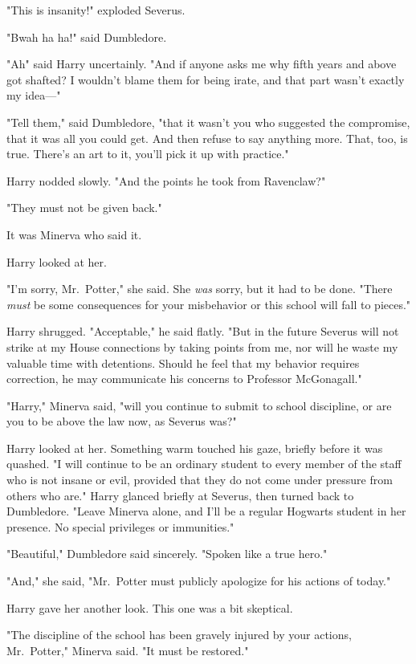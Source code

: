 "This is insanity!" exploded Severus.

"Bwah ha ha!" said Dumbledore.

"Ah{\el}" said Harry uncertainly. "And if anyone asks me why fifth years and
above got shafted? I wouldn't blame them for being irate, and that part wasn't
exactly my idea\mbox{---}"

"Tell them," said Dumbledore, "that it wasn't you who suggested the compromise,
that it was all you could get. And then refuse to say anything more. That, too,
is true. There's an art to it, you'll pick it up with practice."

Harry nodded slowly. "And the points he took from Ravenclaw?"

"They must not be given back."

It was Minerva who said it.

Harry looked at her.

"I'm sorry, Mr.~Potter," she said. She \emph{was} sorry, but it had to be done.
"There \emph{must} be some consequences for your misbehavior or this school
will fall to pieces."

Harry shrugged. "Acceptable," he said flatly. "But in the future Severus will
not strike at my House connections by taking points from me, nor will he waste
my valuable time with detentions. Should he feel that my behavior requires
correction, he may communicate his concerns to Professor McGonagall."

"Harry," Minerva said, "will you continue to submit to school discipline, or
are you to be above the law now, as Severus was?"

Harry looked at her. Something warm touched his gaze, briefly before it was
quashed. "I will continue to be an ordinary student to every member of the
staff who is not insane or evil, provided that they do not come under pressure
from others who are." Harry glanced briefly at Severus, then turned back to
Dumbledore. "Leave Minerva alone, and I'll be a regular Hogwarts student in her
presence. No special privileges or immunities."

"Beautiful," Dumbledore said sincerely. "Spoken like a true hero."

"And," she said, "Mr.~Potter must publicly apologize for his actions of today."

Harry gave her another look. This one was a bit skeptical.

"The discipline of the school has been gravely injured by your actions,
Mr.~Potter," Minerva said. "It must be restored."

